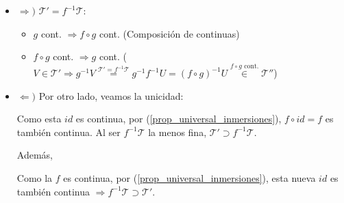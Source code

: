 \begin{demo}
\begin{itemize}
    \item $\Rightarrow)$ $\mathcal{T}' = f^{-1}\mathcal{T}: $ 
    \begin{itemize}
        \item $g$ cont. $\Rightarrow f \circ g$ cont. (Composición de continuas)
        \item $f \circ g$ cont. $\Rightarrow g$ cont. ($V \in \mathcal{T}' \Rightarrow g^{-1}V \stackrel{\mathcal{T}' = f^{-1}\mathcal{T}}{=} g^{-1} f^{-1}U = \left( f \circ g \right)^{-1} U \stackrel{f \circ g \text{ cont.}}{\in} \mathcal{T}''$)
    \end{itemize}

    \item $\Leftarrow)$ Por otro lado, veamos la unicidad:
    \begin{figure}[H]
        \centering    
    \end{figure}
    Como esta $id$ es continua, por (\ref{prop_universal_inmersiones}), $f\circ id = f$ es también continua. Al ser $f^{-1}\mathcal{T}$ la menos fina, $\mathcal{T}' \supset f^{-1}\mathcal{T}$.

    Además, 
    \begin{figure}[H]
        \centering    
    \end{figure}
    Como la $f$ es continua, por (\ref{prop_universal_inmersiones}), esta nueva $id$ es también continua $\Rightarrow f^{-1}\mathcal{T} \supset \mathcal{T}'$.
\end{itemize}
\end{demo}

